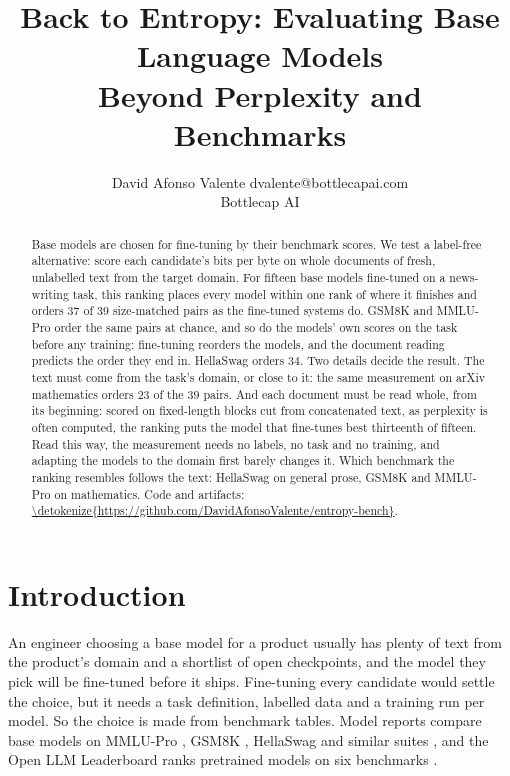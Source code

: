 \documentclass[10pt]{article}
\title{Back to Entropy: Evaluating Base Language Models\\ Beyond Perplexity and Benchmarks}
\author{\name David Afonso Valente \email dvalente@bottlecapai.com \\ \addr Bottlecap AI}
\newif\ifanon \anonfalse
\newcommand{\repourl}{https://github.com/DavidAfonsoValente/entropy-bench}
\newcommand{\repolink}[1]{\expandafter\url\expandafter{\detokenize\expandafter{\repourl#1}}}
\begin{document}
\maketitle
\begin{abstract}
Base models are chosen for fine-tuning by their benchmark scores. We test a label-free alternative:
score each candidate's bits per byte on whole documents of fresh, unlabelled text from the target
domain. For fifteen base models fine-tuned on a news-writing task, this ranking places every model
within one rank of where it finishes and orders $37$ of $39$ size-matched pairs as the fine-tuned
systems do. GSM8K and MMLU-Pro order the same pairs at chance, and so do the models' own scores on
the task before any training: fine-tuning reorders the models, and the document reading predicts
the order they end in. HellaSwag orders $34$. Two details decide the result. The text must come
from the task's domain, or close to it: the same measurement on arXiv mathematics orders $23$ of
the $39$ pairs. And each document must be read whole, from its beginning: scored on fixed-length
blocks cut from concatenated text, as perplexity is often computed, the ranking puts the model
that fine-tunes best thirteenth of fifteen. Read this way, the measurement needs no labels, no
task and no training, and adapting the models to the domain first barely changes it. Which
benchmark the ranking resembles follows the text: HellaSwag on general prose, GSM8K and MMLU-Pro
on mathematics. \ifanon Code and artifacts are provided as
supplementary material.\else Code and artifacts: \repolink{}.\fi
\end{abstract}

\section{Introduction}
\label{sec:intro}
An engineer choosing a base model for a product usually has plenty of text from the product's
domain and a shortlist of open checkpoints, and the model they pick will be fine-tuned before it
ships. Fine-tuning every candidate would settle the choice, but it needs a task definition,
labelled data and a training run per model. So the choice is made from benchmark tables. Model
reports compare base models on MMLU-Pro \citep{wang2024mmlupro}, GSM8K \citep{cobbe2021gsm8k},
HellaSwag \citep{zellers2019hellaswag} and similar suites \citep{yang2024qwen25}, and the Open LLM
Leaderboard ranks pretrained models on six benchmarks \citep{fourrier2024leaderboard}.
\end{document}
